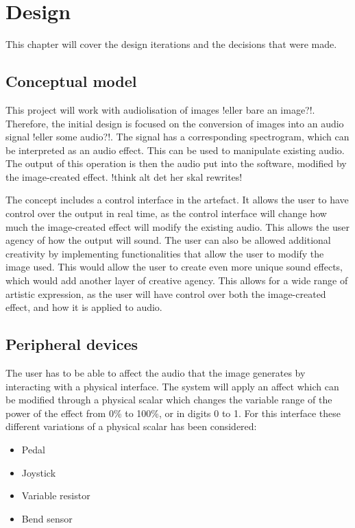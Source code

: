 \chapter{Design}\label{ch:design}
This chapter will cover the design iterations and the decisions that were made. 

\section{Conceptual model}
This project will work with audiolisation of images !eller bare an image?!. Therefore, the initial design is focused on the conversion of images into an audio signal !eller some audio?!. The signal has a corresponding spectrogram, which can be interpreted as an audio effect. This can be used to manipulate existing audio. The output of this operation is then the audio put into the software, modified by the image-created effect. !think alt det her skal rewrites!

The concept includes a control interface in the artefact. It allows the user to have control over the output in real time, as the control interface will change how much the image-created effect will modify the existing audio. This allows the user agency of how the output will sound. The user can also be allowed additional creativity by implementing functionalities that allow the user to modify the image used. This would allow the user to create even more unique sound effects, which would add another layer of creative agency. This allows for a wide range of artistic expression, as the user will have control over both the image-created effect, and how it is applied to audio.

\section{Peripheral devices}
The user has to be able to affect the audio that the image generates by interacting with a physical interface. The system will apply an affect which can be modified through a physical scalar which changes the variable range of the power of the effect from 0\% to 100\%, or in digits 0 to 1. For this interface these different variations of a physical scalar has been considered: 

\begin{itemize}
\item Pedal
\item Joystick
\item Variable resistor
\item Bend sensor
\end{itemize}

